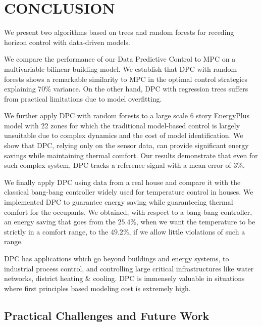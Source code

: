 \section{CONCLUSION}
\label{S:conclusion}

We present two algorithms based on trees and random forests for receding horizon control with data-driven models.

We compare the performance of our Data Predictive Control to MPC on a multivariable bilinear building model. We establish that DPC with random forests shows a remarkable similarity to MPC in the optimal control strategies explaining 70\% variance. On the other hand, DPC with regression trees suffers from practical limitations due to model overfitting.

We further apply DPC with random forests to a large scale 6 story EnergyPlus model with 22 zones for which the traditional model-based control is largely unsuitable due to complex dynamics and the cost of model identification. We show that DPC, relying only on the sensor data, can provide significant energy savings while maintaining thermal comfort. Our results demonstrate that even for such complex system, DPC tracks a reference signal with a mean error of 3\%.

We finally apply DPC using data from a real house and compare it with the classical bang-bang controller widely used for temperature control in houses. We implemented DPC to guarantee energy saving while guaranteeing thermal comfort for the occupants. We obtained, with respect to a bang-bang controller, an energy saving that goes from the $25.4\%$, when we want the temperature to be strictly in a comfort range, to the $49.2\%$, if we allow little violations of such a range.

DPC has applications which go beyond buildings and energy systems, to industrial process control, and controlling large critical infrastructures like water networks, district heating \& cooling. DPC is immensely valuable in situations where first principles based modeling cost is extremely high.

\subsection{Practical Challenges and Future Work}
\label{SS:challenges}
